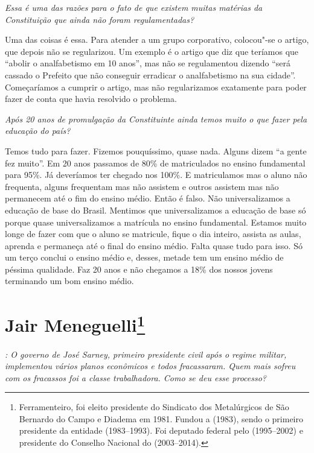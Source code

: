 \medskip

\noindent\emph{Essa é uma das razões para o fato de que existem muitas matérias da
Constituição que ainda não foram regulamentadas?}

Uma das coisas é essa. Para atender a um grupo
corporativo, colocou"-se o artigo, que depois não se regularizou. Um
exemplo é o artigo que diz que teríamos que ``abolir o analfabetismo em
10 anos'', mas não se regulamentou dizendo ``será cassado o Prefeito que
não conseguir erradicar o analfabetismo na sua cidade''. Começaríamos a
cumprir o artigo, mas não regularizamos exatamente para poder fazer de
conta que havia resolvido o problema.

\medskip

\noindent\emph{Após 20 anos de promulgação da Constituinte ainda temos muito o
que fazer pela educação do país?}

Temos tudo para fazer. Fizemos pouquíssimo, quase
nada. Alguns dizem ``a gente fez muito''. Em 20 anos passamos de 80\% de
matriculados no ensino fundamental para 95\%. Já deveríamos ter chegado
nos 100\%. E matriculamos mas o aluno não frequenta, alguns frequentam
mas não assistem e outros assistem mas não permanecem até o fim do
ensino médio. Então é falso. Não universalizamos a educação de base do
Brasil. Mentimos que universalizamos a educação de base só porque quase
universalizamos a matrícula no ensino fundamental. Estamos muito longe
de fazer com que o aluno se matricule, fique o dia inteiro, assista as
aulas, aprenda e permaneça até o final do ensino médio. Falta quase tudo
para isso. Só um terço conclui o ensino médio e, desses, metade tem um
ensino médio de péssima qualidade. Faz 20 anos e não chegamos a 18\% dos
nossos jovens terminando um bom ensino médio.

\chapter{Jair Meneguelli\footnote{Ferramenteiro, foi eleito presidente do Sindicato dos Metalúrgicos de
São Bernardo do Campo e Diadema em 1981. Fundou a  (1983), sendo o
primeiro presidente da entidade (1983--1993). Foi deputado federal pelo
 (1995--2002) e presidente do Conselho Nacional do  (2003--2014).}}

\emph{: O governo de José Sarney, primeiro presidente civil após o
regime militar, implementou vários planos econômicos e todos
fracassaram. Quem mais sofreu com os fracassos foi a classe
trabalhadora. Como se deu esse processo?}

